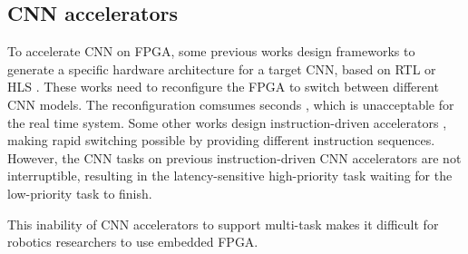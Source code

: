 \subsection{ CNN accelerators }

To accelerate CNN on FPGA, some previous works design frameworks to generate a specific hardware architecture for a target CNN, based on  RTL \cite{li_high_2016} or HLS \cite{lu_evaluating_2017}. These works need to reconfigure the FPGA to switch between different CNN models. The reconfiguration comsumes seconds \cite{Papadimitriou2011Performance}, which is unacceptable for the real time system.
Some other works design instruction-driven accelerators \cite{yu2018instruction,qiu2016going,guo2017angel}, making rapid switching possible by providing different instruction sequences. 
However, the CNN tasks on previous instruction-driven CNN accelerators are not interruptible, resulting in the latency-sensitive high-priority task waiting for the low-priority task to finish. 

This inability of CNN accelerators to support multi-task makes it difficult for robotics researchers to use embedded FPGA.


